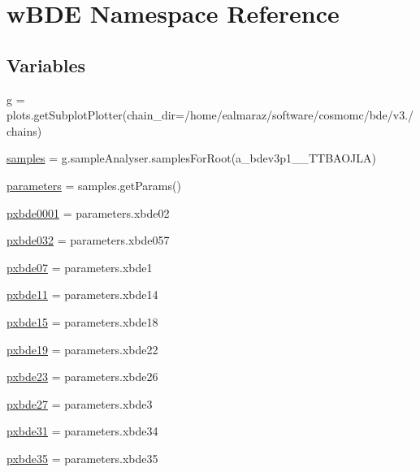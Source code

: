 \hypertarget{namespacewBDE}{}\section{w\+B\+DE Namespace Reference}
\label{namespacewBDE}
\subsection*{Variables}
\begin{DoxyCompactItemize}
\item 
\mbox{\hyperlink{namespacewBDE_a0af99caaea92cb479d155f489102f46e}{g}} = plots.\+get\+Subplot\+Plotter(chain\+\_\+dir=\textquotesingle{}/home/ealmaraz/software/cosmomc/bde/v3./chains\textquotesingle{})
\item 
\mbox{\hyperlink{namespacewBDE_a190e9eea8c62fbd77ea21769fa8bcd6e}{samples}} = g.\+sample\+Analyser.\+samples\+For\+Root(\textquotesingle{}a\+\_\+bdev3p1\+\_\+\_\+\+T\+T\+B\+A\+O\+J\+LA\textquotesingle{})
\item 
\mbox{\hyperlink{namespacewBDE_a2168a563a3827add322d9b282b9e55b9}{parameters}} = samples.\+get\+Params()
\item 
\mbox{\hyperlink{namespacewBDE_a3364caa4a71712e896caa616959a9d0a}{pxbde0001}} = parameters.\+xbde02
\item 
\mbox{\hyperlink{namespacewBDE_a8b2addd591e7cc71e403791326d90ee7}{pxbde032}} = parameters.\+xbde057
\item 
\mbox{\hyperlink{namespacewBDE_a368acc25f4b861fa7b2faac777a05746}{pxbde07}} = parameters.\+xbde1
\item 
\mbox{\hyperlink{namespacewBDE_a13f4d0810b90fa0f710d417a83991c4b}{pxbde11}} = parameters.\+xbde14
\item 
\mbox{\hyperlink{namespacewBDE_a76f2d79141cfd28e34bd03cfbbeda4de}{pxbde15}} = parameters.\+xbde18
\item 
\mbox{\hyperlink{namespacewBDE_a8be5e22cc7d10b1d536686147c180318}{pxbde19}} = parameters.\+xbde22
\item 
\mbox{\hyperlink{namespacewBDE_a5084a255b4e77b3bc5e00a3fb1e32dd2}{pxbde23}} = parameters.\+xbde26
\item 
\mbox{\hyperlink{namespacewBDE_a42ee82812f5f4b4eeda7d06b418b8b38}{pxbde27}} = parameters.\+xbde3
\item 
\mbox{\hyperlink{namespacewBDE_a55d0532f38c00821cb189d68141088ba}{pxbde31}} = parameters.\+xbde34
\item 
\mbox{\hyperlink{namespacewBDE_a191d448c5a5e490e61328d7f371c7f33}{pxbde35}} = parameters.\+xbde35

\end{DoxyCompactItemize}
